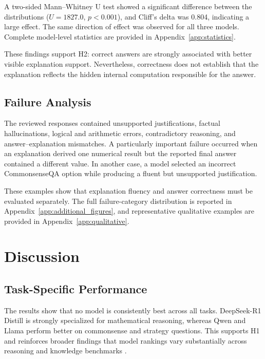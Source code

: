 \documentclass{article}
\begin{document}
A two-sided Mann--Whitney U test showed a significant difference between
the distributions
($U=1827.0$, $p<0.001$), and Cliff's delta was 0.804, indicating a
large effect. The same direction of effect was observed for all three
models. Complete model-level statistics are provided in
Appendix~\ref{app:statistics}.

These findings support H2: correct answers are strongly associated with
better visible explanation support. Nevertheless, correctness does not
establish that the explanation reflects the hidden internal computation
responsible for the answer.

\subsection{Failure Analysis}

The reviewed responses contained unsupported justifications, factual
hallucinations, logical and arithmetic errors, contradictory reasoning,
and answer--explanation mismatches. A particularly important failure
occurred when an explanation derived one numerical result but the
reported final answer contained a different value. In another case, a
model selected an incorrect CommonsenseQA option while producing a
fluent but unsupported justification.

These examples show that explanation fluency and answer correctness
must be evaluated separately. The full failure-category distribution is
reported in Appendix~\ref{app:additional_figures}, and representative
qualitative examples are provided in
Appendix~\ref{app:qualitative}.


\section{Discussion}

\subsection{Task-Specific Performance}

The results show that no model is consistently best across all tasks.
DeepSeek-R1 Distill is strongly specialized for mathematical reasoning,
whereas Qwen and Llama perform better on commonsense and strategy
questions. This supports H1 and reinforces broader findings that model
rankings vary substantially across reasoning and knowledge benchmarks
\cite{liang2023helm,hendrycks2021mmlu,
srivastava2023bigbench,zellers2019hellaswag}.
\end{document}

